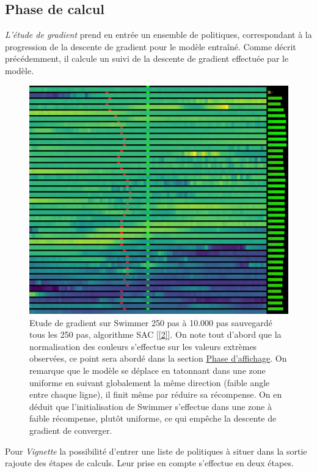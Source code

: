 \documentclass[12pt]{article}
\begin{document}
\subsection{Phase de calcul}

\emph{L'étude de gradient} prend en entrée un ensemble de politiques, correspondant à la progression de la descente de gradient pour le modèle entraîné. Comme décrit précédemment, il calcule un suivi de la descente de gradient effectuée par le modèle. \\

\begin{figure}[htp]
    \centering
    \includegraphics[width=15cm]{Images/gradientStudy_swimmer}
    \caption{Etude de gradient sur Swimmer 250 pas à 10.000 pas sauvegardé tous les 250 pas, algorithme SAC \ref{[2]}. On note tout d'abord que la normalisation des couleurs s'effectue sur les valeurs extrèmes observées, ce point sera abordé dans la section \hyperref[sec:affichage]{Phase d'affichage}. On remarque que le modèle se déplace en tatonnant dans une zone uniforme en suivant globalement la même direction (faible angle entre chaque ligne), il finit même par réduire sa récompense. On en déduit que l'initialisation de Swimmer s'effectue dans une zone à faible récompense, plutôt uniforme, ce qui empêche la descente de gradient de converger.}
    \label{fig:gradientStudy}
\end{figure}

Pour \emph{Vignette} la possibilité d'entrer une liste de politiques à situer dans la sortie rajoute des étapes de calculs. Leur prise en compte s'effectue en deux étapes. \\
\end{document}
